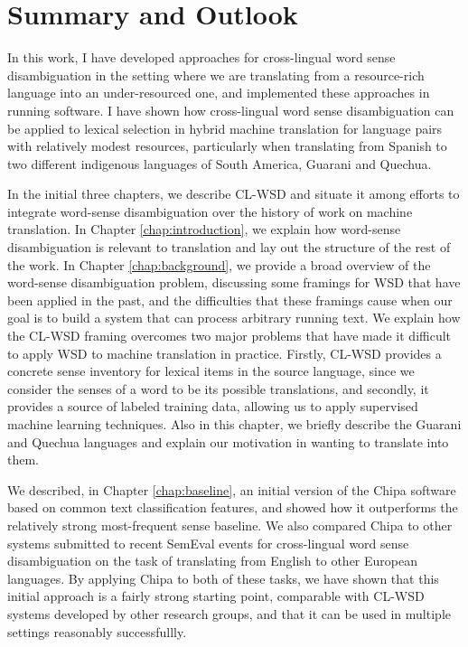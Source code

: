 \chapter{Summary and Outlook}
\label{chap:conclusions}

In this work, I have developed approaches for cross-lingual word sense
disambiguation in the setting where we are translating from a resource-rich
language into an under-resourced one, and implemented these approaches in
running software.
I have shown how cross-lingual word sense disambiguation can be applied to
lexical selection in hybrid machine translation for language pairs with
relatively modest resources, particularly when translating from Spanish to two
different indigenous languages of South America, Guarani and Quechua.

In the initial three chapters, we describe CL-WSD and situate it among efforts
to integrate word-sense disambiguation over the history of work on machine
translation. In Chapter \ref{chap:introduction}, we explain how word-sense
disambiguation is relevant to translation and lay out the structure of the rest
of the work.
In Chapter \ref{chap:background}, we provide a broad overview of
the word-sense disambiguation problem, discussing some framings for WSD that
have been applied in the past, and the difficulties that these framings cause
when our goal is to build a system that can process arbitrary running text.
We explain how the CL-WSD framing overcomes two major problems that have made
it difficult to apply WSD to machine translation in practice. Firstly, CL-WSD
provides a concrete sense inventory for lexical items in the source language,
since we consider the senses of a word to be its possible translations, and
secondly, it provides a source of labeled training data, allowing us to apply
supervised machine learning techniques. Also in this chapter, we briefly
describe the Guarani and Quechua languages and explain our motivation in
wanting to translate into them.


We described, in Chapter \ref{chap:baseline}, an initial version of the Chipa
software based on common text classification features, and showed how it
outperforms the relatively strong most-frequent sense baseline. We also
compared Chipa to other systems submitted to recent SemEval events for
cross-lingual word sense disambiguation on the task of translating from English
to other European languages. By applying Chipa to both of these tasks, we have
shown that this initial approach is a fairly strong starting point, comparable
with CL-WSD systems developed by other research groups, and that it can be
used in multiple settings reasonably successfullly.

